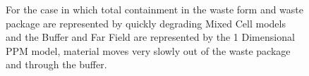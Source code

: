 
\begin{figure}[ht]
\caption[$^{235}U$ residence 1 Dimensional PPM Model.]{
For the case in which total containment in the waste form and waste package are 
represented by quickly degrading Mixed Cell models and the Buffer and Far Field 
are represented by the 1 Dimensional PPM model, material moves very slowly out 
of the waste package and through the buffer.
}
\label{fig:1dppmall}
\end{figure}
